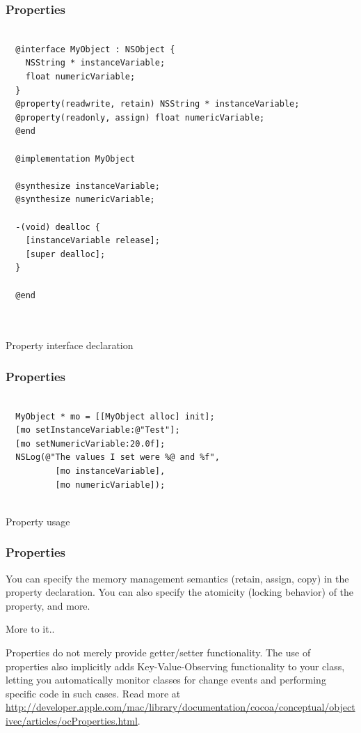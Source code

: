 \documentclass[10pt]{beamer}
\begin{document}
\begin{frame}[fragile]
  \frametitle{Properties}
  \begin{listing}[H]
    \begin{verbatim}
  
  @interface MyObject : NSObject {
    NSString * instanceVariable;
    float numericVariable;
  }
  @property(readwrite, retain) NSString * instanceVariable;
  @property(readonly, assign) float numericVariable;
  @end
  
  @implementation MyObject
  
  @synthesize instanceVariable;
  @synthesize numericVariable;
  
  -(void) dealloc {
    [instanceVariable release];
    [super dealloc];
  }
  
  @end 
    
              
  \end{verbatim}
    \caption{Property interface declaration}
    \label{listing:11}
  \end{listing}

\end{frame}

\begin{frame}[fragile]
  \frametitle{Properties}
  \begin{listing}[H]
    \begin{verbatim}
  
  MyObject * mo = [[MyObject alloc] init];
  [mo setInstanceVariable:@"Test"];
  [mo setNumericVariable:20.0f];
  NSLog(@"The values I set were %@ and %f",
          [mo instanceVariable], 
          [mo numericVariable]);
              
  \end{verbatim}
    \caption{Property usage}
    \label{listing:12}
  \end{listing}

\end{frame}

\begin{frame}[fragile]
  \frametitle{Properties}
  You can specify the memory management semantics (retain, assign, copy) in the property declaration.  You can also specify the atomicity (locking behavior) of the property, and more.
\begin{block}{More to it..}
  
  Properties do not merely provide getter/setter functionality.  The use of properties
  also implicitly adds Key-Value-Observing functionality to your class, letting
  you automatically monitor classes for change events and performing specific code
  in such cases.  Read more at \url{http://developer.apple.com/mac/library/documentation/cocoa/conceptual/objectivec/articles/ocProperties.html}.
              
  \end{block}

\end{frame}
\end{document}
